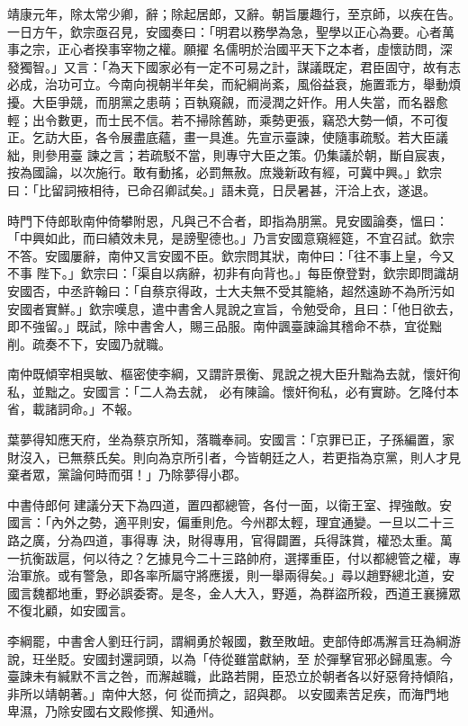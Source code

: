 \begin{pinyinscope}
 靖康元年，除太常少卿，辭；除起居郎，又辭。朝旨屢趣行，至京師，以疾在告。一日方午，欽宗亟召見，安國奏曰：「明君以務學為急，聖學以正心為要。心者萬事之宗，正心者揆事宰物之權。願擢
 名儒明於治國平天下之本者，虛懷訪問，深發獨智。」又言：「為天下國家必有一定不可易之計，謀議既定，君臣固守，故有志必成，治功可立。今南向視朝半年矣，而紀綱尚紊，風俗益衰，施置乖方，舉動煩擾。大臣爭競，而朋黨之患萌；百執窺覦，而浸潤之奸作。用人失當，而名器愈輕；出令數更，而士民不信。若不掃除舊跡，乘勢更張，竊恐大勢一傾，不可復正。乞訪大臣，各令展盡底蘊，畫一具進。先宣示臺諫，使隨事疏駁。若大臣議絀，則參用臺
 諫之言；若疏駁不當，則專守大臣之策。仍集議於朝，斷自宸衷，按為國論，以次施行。敢有動搖，必罰無赦。庶幾新政有經，可冀中興。」欽宗曰：「比留詞掖相待，已命召卿試矣。」語未竟，日昃暑甚，汗洽上衣，遂退。



 時門下侍郎耿南仲倚攀附恩，凡與己不合者，即指為朋黨。見安國論奏，慍曰：「中興如此，而曰績效未見，是謗聖德也。」乃言安國意窺經筵，不宜召試。欽宗不答。安國屢辭，南仲又言安國不臣。欽宗問其狀，南仲曰：「往不事上皇，今又不事
 陛下。」欽宗曰：「渠自以病辭，初非有向背也。」每臣僚登對，欽宗即問識胡安國否，中丞許翰曰：「自蔡京得政，士大夫無不受其籠絡，超然遠跡不為所污如安國者實鮮。」欽宗嘆息，遣中書舍人晁說之宣旨，令勉受命，且曰：「他日欲去，即不強留。」既試，除中書舍人，賜三品服。南仲諷臺諫論其稽命不恭，宜從黜削。疏奏不下，安國乃就職。



 南仲既傾宰相吳敏、樞密使李綱，又謂許景衡、晁說之視大臣升黜為去就，懷奸徇私，並黜之。安國言：「二人為去就，
 必有陳論。懷奸徇私，必有實跡。乞降付本省，載諸詞命。」不報。



 葉夢得知應天府，坐為蔡京所知，落職奉祠。安國言：「京罪已正，子孫編置，家財沒入，已無蔡氏矣。則向為京所引者，今皆朝廷之人，若更指為京黨，則人才見棄者眾，黨論何時而弭！」乃除夢得小郡。



 中書侍郎何𣓨建議分天下為四道，置四都總管，各付一面，以衛王室、捍強敵。安國言：「內外之勢，適平則安，偏重則危。今州郡太輕，理宜通變。一旦以二十三路之廣，分為四道，事得專
 決，財得專用，官得闢置，兵得誅賞，權恐太重。萬一抗衡跋扈，何以待之？乞據見今二十三路帥府，選擇重臣，付以都總管之權，專治軍旅。或有警急，即各率所屬守將應援，則一舉兩得矣。」尋以趙野總北道，安國言魏都地重，野必誤委寄。是冬，金人大入，野遁，為群盜所殺，西道王襄擁眾不復北顧，如安國言。



 李綱罷，中書舍人劉玨行詞，謂綱勇於報國，數至敗衄。吏部侍郎馮澥言玨為綱游說，玨坐貶。安國封還詞頭，以為「侍從雖當獻納，至
 於彈擊官邪必歸風憲。今臺諫未有緘默不言之咎，而澥越職，此路若開，臣恐立於朝者各以好惡脅持傾陷，非所以靖朝著。」南仲大怒，何𣓨從而擠之，詔與郡。𣓨以安國素苦足疾，而海門地卑濕，乃除安國右文殿修撰、知通州。




\end{pinyinscope}

